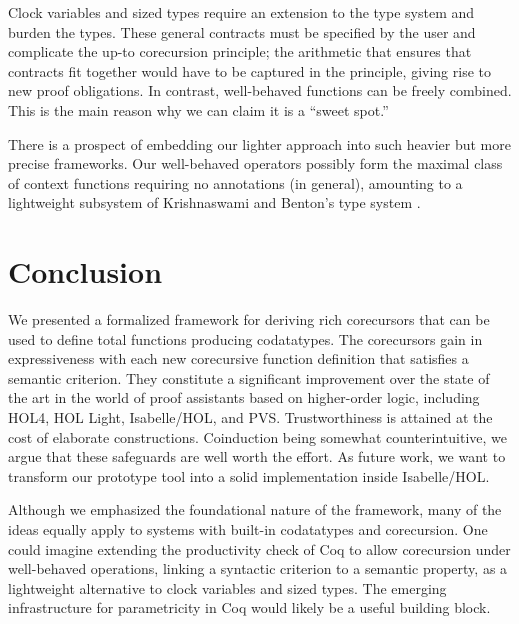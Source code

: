 \documentclass[preprint,draft]
{sigplanconf}
\newcommand{\<}{\langle}
\renewcommand{\>}{\rangle}
\begin{document}
Clock variables and sized types require an extension to the type system and
burden the types. These general contracts must be specified by the user and
complicate the up-to corecursion principle; the arithmetic that ensures that
contracts fit together would have to be captured in the principle, giving rise
to new proof obligations. In contrast, well-behaved functions can be freely
combined. This is the main reason why we can claim it is a ``sweet spot.''

There is a prospect of embedding our lighter approach into such heavier but more precise frameworks.
Our well-behaved
operators possibly form the maximal class of context functions
requiring no annotations (in general), amounting to a lightweight subsystem
of Krishnaswami and Benton's type system \cite{usrp1}.



\section{Conclusion}
\label{sec-conc}

We presented a formalized framework for deriving rich corecursors that can be used to
define total functions producing codatatypes. The corecursors gain in
expressiveness with each new corecursive function definition that satisfies a
semantic criterion. They constitute a significant improvement over the state of
the art in the world of proof assistants based on higher-order logic,
including HOL4, HOL Light, Isabelle\slash HOL, and PVS.
Trustworthiness is attained at the cost of elaborate constructions.
Coinduction being somewhat counterintuitive,
we argue that these safeguards are well worth the effort.
As future work, we want
to transform our prototype tool into a solid implementation inside
Isabelle\slash HOL. 



Although we emphasized the foundational nature of the framework, many of the
ideas equally apply to systems with built-in codatatypes and
corecursion. One could imagine extending the productivity check of
Coq to allow corecursion under well-behaved operations, linking a syntactic
criterion to a semantic property, as a lightweight alternative to
clock variables and sized types. The emerging infrastructure
for parametricity in Coq \cite{bernardy-et-al-2012-param,keller-lasson-2012}
would likely be a useful building block.
\end{document}
